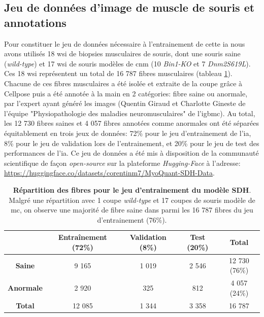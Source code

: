 \subsection{Jeu de données d'image de muscle de souris et annotations}
Pour constituer le jeu de données nécessaire à l'entrainement de cette \gls{ia} nous avons utilisés 18 \gls{wsi} de biopsies musculaires de souris, dont une souris saine (\textit{wild-type}) et 17 \gls{wsi} de souris modèles de \gls{cnm} (10 \textit{Bin1-KO} et 7 \textit{Dnm2S619L}). Ces 18 \gls{wsi} représentent un total de 16 787 fibres musculaires (tableau \ref{tab:sdh_fiber_count}). Chacune de ces fibres musculaires a été isolée et extraite de la coupe grâce à Cellpose puis a été annotée à la main en 2 catégories: fibre saine ou anormale, par l'expert ayant généré les images (Quentin Giraud et Charlotte Gineste de l'équipe "Physiopathologie des maladies neuromusculaires" de l'\gls{igbmc}). Au total, les 12 730 fibres saines et 4 057 fibres annotées comme anormales ont été séparées équitablement en trois jeux de données: 72\% pour le jeu d'entrainement de l'\gls{ia}, 8\% pour le jeu de validation lors de l'entrainement, et 20\% pour le jeu de test des performances de l'\gls{ia}. Ce jeu de données a été mis à disposition de la communauté scientifique de façon \textit{open-source} sur la plateforme \textit{Hugging-Face} à l'adresse: \href{https://huggingface.co/datasets/corentinm7/MyoQuant-SDH-Data}{https://huggingface.co/datasets/corentinm7/MyoQuant-SDH-Data}.

\begin{table}[htbp]
\centering
\caption[Répartition des fibres pour le jeu d'entrainement du modèle SDH]{\textbf{Répartition des fibres pour le jeu d'entrainement du modèle SDH}. Malgré une répartition avec 1 coupe \textit{wild-type} et 17 coupes de souris modèle de \gls{mc}, on observe une majorité de fibre saine dans parmi les 16 787 fibres du jeu d'entrainement (76\%).}
\label{tab:sdh_fiber_count}
\begin{tabular}{|c|c|c|c|c|}
\hline
 & \textbf{Entraînement} (72\%) & \textbf{Validation} (8\%) & \textbf{Test} (20\%) & \textbf{Total} \\
\hline
\textbf{Saine} & 9 165 & 1 019 & 2 546 & 12 730 (76\%) \\
\hline
\textbf{Anormale} & 2 920 & 325 & 812 & 4 057 (24\%) \\
\hline
\hline
\textbf{Total} & 12 085 & 1 344 & 3 358 & 16 787 \\
\hline
\end{tabular}
\end{table}


